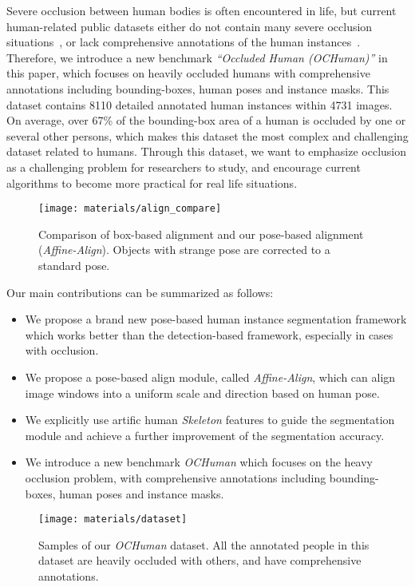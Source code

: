 \documentclass[10pt,twocolumn,letterpaper]{article}
\begin{document}
Severe occlusion between human bodies is often encountered in life, but current human-related public datasets either do not contain many severe occlusion situations~\cite{dollar2009pedestrian,geiger2012we,lin2014microsoft}, or lack comprehensive annotations of the human instances~\cite{shao2018crowdhuman}. Therefore, we introduce a new benchmark \emph{``Occluded Human (OCHuman)''} in this paper, which focuses on heavily occluded humans with comprehensive annotations including bounding-boxes, human poses and instance masks. This dataset contains 8110 detailed annotated human instances within 4731 images. On average, over 67\% of the bounding-box area of a human is occluded by one or several other persons, which makes this dataset the most complex and challenging dataset related to humans. Through this dataset, we want to emphasize occlusion as a challenging problem for researchers to study, and encourage current algorithms to become more practical for real life situations.

\begin{figure}
\centering
\texttt{[image: materials/align\_compare]}
\setlength{\abovecaptionskip}{-0.3cm}
\setlength{\belowcaptionskip}{-0.5cm}
\caption{Comparison of box-based alignment and our pose-based alignment (\emph{Affine-Align}). Objects with strange pose are corrected to a standard pose.}
\label{fig:skiing}
\end{figure}

Our main contributions can be summarized as follows:

\begin{itemize}
\item We propose a brand new pose-based human instance segmentation framework which works better than the detection-based framework, especially in cases with occlusion.
\item We propose a pose-based align module, called \emph{Affine-Align}, which can align image windows into a uniform scale and direction based on human pose.
\item We explicitly use artific human \emph{Skeleton} features to guide the segmentation module and achieve a further improvement of the segmentation accuracy.
\item We introduce a new benchmark \emph{OCHuman} which focuses on the heavy occlusion problem, with comprehensive annotations including bounding-boxes, human poses and instance masks.
\end{itemize}

 \begin{figure*}[t]
\centering
\texttt{[image: materials/dataset]} 
\setlength{\abovecaptionskip}{-0.3cm}
\setlength{\belowcaptionskip}{-0.5cm}
\caption{Samples of our \emph{OCHuman} dataset. All the annotated people in this dataset are heavily occluded with others, and have comprehensive annotations.}
\label{fig:dataset}
\end{figure*}
\end{document}
